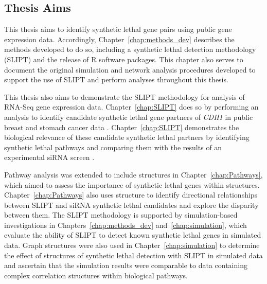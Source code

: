 \subsection{Thesis Aims}

This thesis aims to identify \gls{synthetic lethal} gene pairs using public \gls{gene expression} data. Accordingly, Chapter~\ref{chap:methods_dev} describes the methods developed to do so, including a \gls{synthetic lethal} detection methodology (\gls{SLIPT}) and the release of R software packages. This chapter also serves to document the original simulation and network analysis procedures developed to support the use of \gls{SLIPT} and perform analyses throughout this thesis. 

This thesis also aims to demonstrate the \gls{SLIPT} methodology for analysis of \gls{RNA-Seq} \gls{gene expression} data. Chapter~\ref{chap:SLIPT} does so by performing an analysis to identify candidate \gls{synthetic lethal} gene partners of \textit{CDH1} in public breast and stomach cancer data \citep{TCGA2012, TCGA2014GC}. Chapter~\ref{chap:SLIPT} demonstrates the biological relevance of these candidate \gls{synthetic lethal} partners by identifying \gls{synthetic lethal} pathways and comparing them with the results of an experimental \gls{siRNA} screen \citep{Telford2015}.

Pathway analysis was extended to include  structures in Chapter~\ref{chap:Pathways}, which aimed to assess the importance of \gls{synthetic lethal} genes within  structures. Chapter~\ref{chap:Pathways} also uses  structure to identify directional relationships between \gls{SLIPT} and \gls{siRNA} \gls{synthetic lethal} candidates and explore the disparity between them. The \gls{SLIPT} methodology is supported by simulation-based investigations in Chapters~\ref{chap:methods_dev} and~\ref{chap:simulation}, which evaluate the ability of \gls{SLIPT} to detect known \gls{synthetic lethal} genes in simulated data. Graph structures were also used in Chapter~\ref{chap:simulation} to determine the effect of  structures of \gls{synthetic lethal} detection with \gls{SLIPT} in simulated data and ascertain that the simulation results were comparable to  data containing complex correlation structures within biological pathways.

